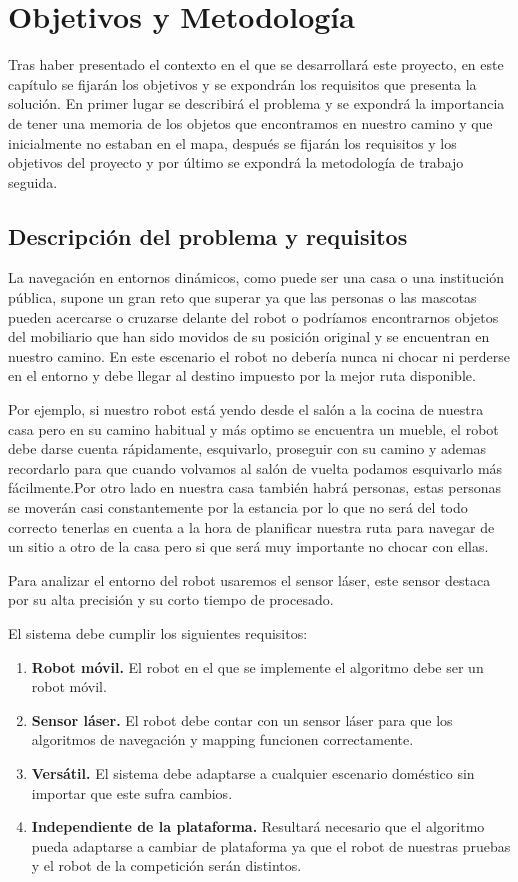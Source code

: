 \chapter{Objetivos y Metodología}
\label{cap:objetivos}
Tras haber presentado el contexto en el que se desarrollará este proyecto, en este capítulo se fijarán los objetivos y se expondrán los requisitos que presenta la solución. En primer lugar se describirá el problema y se expondrá la importancia de tener una memoria de los objetos que encontramos en nuestro camino y que inicialmente no estaban en el mapa, después se fijarán los requisitos y los objetivos del proyecto y por último se expondrá la metodología de trabajo seguida.

\section{Descripción del problema y requisitos}
\label{sec:descripciondelproblema}

La navegación en entornos dinámicos, como puede ser una casa o una institución pública, supone un gran reto que superar ya que las personas o las mascotas pueden acercarse o cruzarse delante del robot o podríamos encontrarnos objetos del mobiliario que han sido movidos de su posición original y se encuentran en nuestro camino. En este escenario el robot no debería nunca ni chocar ni perderse en el entorno y debe llegar al destino impuesto por la mejor ruta disponible.

Por ejemplo, si nuestro robot está yendo desde el salón a la cocina de nuestra casa pero en su camino habitual y más optimo se encuentra un mueble, el robot debe darse cuenta rápidamente, esquivarlo, proseguir con su camino y ademas recordarlo para que cuando volvamos al salón de vuelta podamos esquivarlo más fácilmente.Por otro lado en nuestra casa también habrá personas, estas personas se moverán casi constantemente por la estancia por lo que no será del todo correcto tenerlas en cuenta a la hora de planificar nuestra ruta para navegar de un sitio a otro de la casa pero si que será muy importante no chocar con ellas.

Para analizar el entorno del robot usaremos el sensor láser, este sensor destaca por su alta precisión y su corto tiempo de procesado.

El sistema debe cumplir los siguientes requisitos:
\begin{enumerate}
\item \textbf{Robot móvil.} El robot en el que se implemente el algoritmo debe ser un robot móvil.
\item \textbf{Sensor láser.} El robot debe contar con un sensor láser para que los algoritmos de navegación y mapping funcionen correctamente.
\item \textbf{Versátil.} El sistema debe adaptarse a cualquier escenario doméstico sin importar que este sufra cambios.
\item \textbf{Independiente de la plataforma.} Resultará necesario que el algoritmo pueda adaptarse a cambiar de plataforma ya que el robot de nuestras pruebas y el robot de la competición serán distintos.
\end{enumerate}

